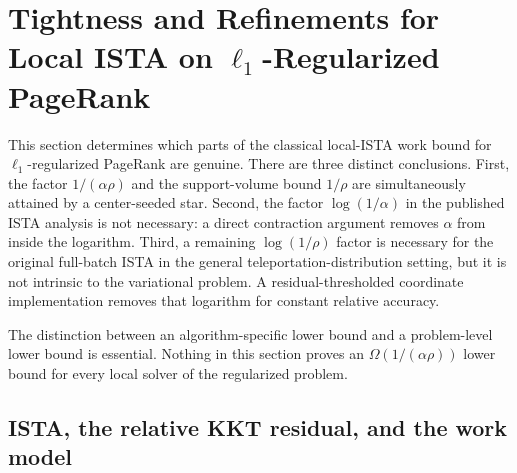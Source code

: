 %
%

\section{Tightness and Refinements for Local ISTA on
\texorpdfstring{$\ell_1$}{l1}-Regularized PageRank}
\label{sec:rppr-ista-tightness}

This section determines which parts of the classical local-ISTA work bound
for \(\ell_1\)-regularized PageRank are genuine.  There are three distinct
conclusions.  First, the factor \(1/(\alpha\rho)\) and the support-volume
bound \(1/\rho\) are simultaneously attained by a center-seeded star.
Second, the factor \(\log(1/\alpha)\) in the published ISTA analysis is not
necessary: a direct contraction argument removes \(\alpha\) from inside the
logarithm.  Third, a remaining \(\log(1/\rho)\) factor is necessary for the
original full-batch ISTA in the general teleportation-distribution setting,
but it is not intrinsic to the variational problem.  A residual-thresholded
coordinate implementation removes that logarithm for constant relative
accuracy.

The distinction between an algorithm-specific lower bound and a
problem-level lower bound is essential.  Nothing in this section proves an
\(\Omega(1/(\alpha\rho))\) lower bound for every local solver of the
regularized problem.

\subsection{ISTA, the relative KKT residual, and the work model}
\label{subsec:rppr-ista-setup}

